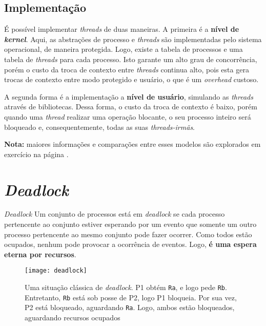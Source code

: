 \subsection{Implementação}
É possível implementar \textit{threads} de duas maneiras. A primeira é a \textbf{nível de \textit{kernel}}. Aqui, as abstrações de processo e \textit{threads} são implementadas pelo sistema operacional, de maneira protegida. Logo, existe a tabela de processos e uma tabela de \textit{threads} para cada processo. Isto garante um alto grau de concorrência, porém o custo da troca de contexto entre \textit{threads} continua alto, pois esta gera trocas de contexto entre modo protegido e usuário, o que é um \textit{overhead} custoso.

A segunda forma é a implementação a \textbf{nível de usuário}, simulando as \textit{threads} através de bibliotecas. Dessa forma, o custo da troca de contexto é baixo, porém quando uma \textit{thread} realizar uma operação blocante, o seu processo inteiro será bloqueado e, consequentemente, todas as suas \textit{threads-irmãs}.

\textbf{Nota:} maiores informações e comparações entre esses modelos são explorados em exercício na página \pageref{ex:threads-implementation-comparison}.







\section{\textit{Deadlock}}
\begin{definicao}{\textit{Deadlock}}
  Um conjunto de processos está em \textit{deadlock} se cada processo pertencente ao conjunto estiver esperando por um evento que somente um outro processo pertencente ao mesmo conjunto pode fazer ocorrer. Como todos estão ocupados, nenhum pode provocar a ocorrência de eventos. Logo, \textbf{é uma espera eterna por recursos}.
\end{definicao}

\begin{figure}[ht]
  \centering
  \texttt{[image: deadlock]}
  \caption{Uma situação clássica de \textit{deadlock}. P1 obtém \texttt{Ra}, e logo pede \texttt{Rb}. Entretanto, \texttt{Rb} está sob posse de P2, logo P1 bloqueia. Por sua vez, P2 está bloqueado, aguardando \texttt{Ra}. Logo, ambos estão bloqueados, aguardando recursos ocupados}
  \label{fig:deadlock}
\end{figure}

